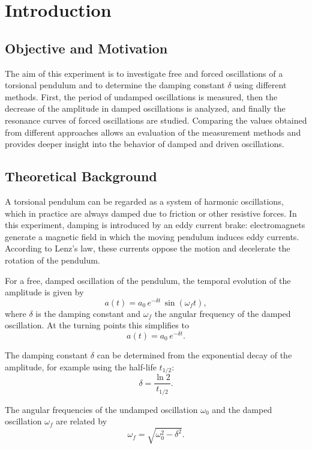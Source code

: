 \chapter{Introduction}

\section{Objective and Motivation}
The aim of this experiment is to investigate free and forced oscillations of a torsional pendulum and to determine the damping constant $\delta$ using different methods. First, the period of undamped oscillations is measured, then the decrease of the amplitude in damped oscillations is analyzed, and finally the resonance curves of forced oscillations are studied. Comparing the values obtained from different approaches allows an evaluation of the measurement methods and provides deeper insight into the behavior of damped and driven oscillations.

\section{Theoretical Background}
\cite{skript25}
A torsional pendulum can be regarded as a system of harmonic oscillations, which in practice are always damped due to friction or other resistive forces. In this experiment, damping is introduced by an eddy current brake: electromagnets generate a magnetic field in which the moving pendulum induces eddy currents. According to Lenz’s law, these currents oppose the motion and decelerate the rotation of the pendulum.

For a free, damped oscillation of the pendulum, the temporal evolution of the amplitude is given by
\begin{equation}
a(t) = a_0 \, e^{-\delta t} \, \sin(\omega_f t),
\end{equation}
where $\delta$ is the damping constant and $\omega_f$ the angular frequency of the damped oscillation. At the turning points this simplifies to
\begin{equation}
a(t) = a_0 \, e^{-\delta t}.
\end{equation}

The damping constant $\delta$ can be determined from the exponential decay of the amplitude, for example using the half-life $t_{1/2}$:
\begin{equation}
\delta = \frac{\ln 2}{t_{1/2}}.
\end{equation}

The angular frequencies of the undamped oscillation $\omega_0$ and the damped oscillation $\omega_f$ are related by
\begin{equation}
\omega_f = \sqrt{\omega_0^2 - \delta^2}.
\end{equation}

